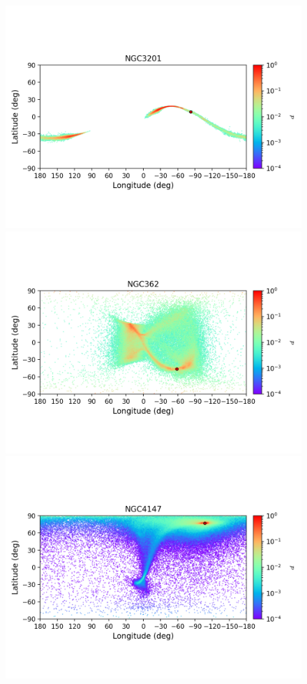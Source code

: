         \begin{figure}
        \includegraphics[clip=true, trim = 0mm 20mm 0mm 10mm, width=1\columnwidth]{images/error_plots_NGC3201.png}
        \includegraphics[clip=true, trim = 0mm 20mm 0mm 10mm, width=1\columnwidth]{images/error_plots_NGC362.png}
        \includegraphics[clip=true, trim = 0mm 20mm 0mm 10mm, width=1\columnwidth]{images/error_plots_NGC4147.png}

\end{figure}
